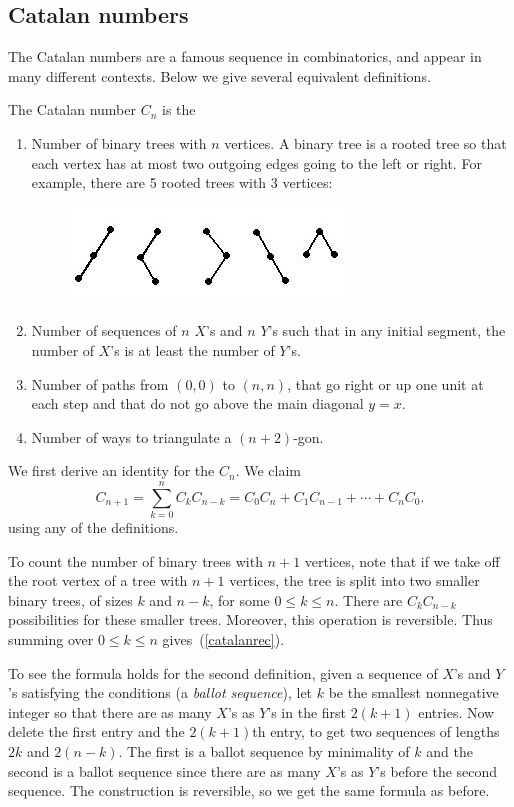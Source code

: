 \subsection{Catalan numbers}\label{catalan}
The Catalan numbers are a famous sequence in combinatorics, and appear in many different contexts. Below we give several equivalent definitions.
\begin{df}
The Catalan number $C_n$ is the
\begin{enumerate}
\item
Number of binary trees with $n$ vertices. A binary tree is a rooted tree so that each vertex has at most two outgoing edges going to the left or right. For example, there are 5 rooted trees with 3 vertices:
\begin{figure}[h!] 
\centering
\includegraphics{bintrees}
\end{figure}
\item
Number of sequences of $n$ $X$'s and $n$ $Y$'s such that in any initial segment, the number of $X$'s is at least the number of $Y$'s.
\item
Number of paths from $(0,0)$ to $(n,n)$, that go right or up one unit at each step and that do not go above the main diagonal $y=x$.
\item Number of ways to triangulate a $(n+2)$-gon.
\end{enumerate}
\end{df}
We first derive an identity for the $C_n$.
We claim
\begin{equation}\label{catalanrec}
C_{n+1}=\sum_{k=0}^n C_kC_{n-k}=C_0C_n+C_1C_{n-1}+\cdots+ C_nC_0.
\end{equation}
using any of the definitions. 

To count the number of binary trees with $n+1$ vertices, note that if we take off the root vertex of a tree with $n+1$ vertices, the tree is split into two smaller binary trees, of sizes $k$ and $n-k$, for some $0\le k\le n$. There are $C_kC_{n-k}$ possibilities for these smaller trees. Moreover, this operation is reversible. Thus summing over $0\le k\le n$ gives~(\ref{catalanrec}).

To see the formula holds for the second definition, given a sequence of $X$'s and $Y$'s satisfying the conditions (a {\it ballot sequence}), let $k$ be the smallest nonnegative integer so that there are as many $X$'s as $Y$'s in the first $2(k+1)$ entries. Now delete the first entry and the $2(k+1)$th entry, to get two sequences of lengths $2k$ and $2(n-k)$. The first is a ballot sequence by minimality of $k$ and the second is a ballot sequence since there are as many $X$'s as $Y$'s before the second sequence. The construction is reversible, so we get the same formula as before.

